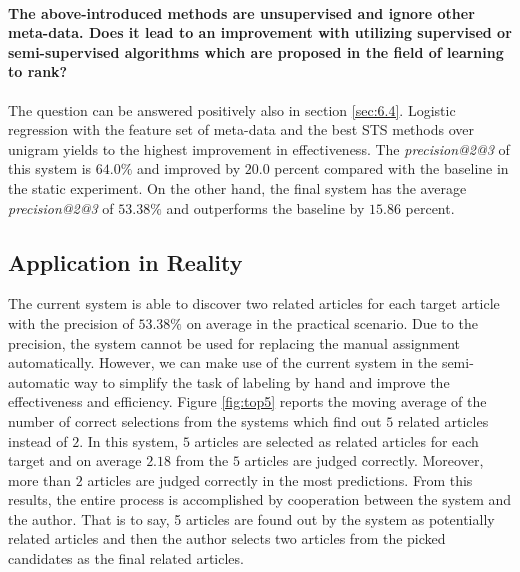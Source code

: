 \paragraph{The above-introduced methods are unsupervised and ignore other meta-data. Does it lead to an improvement with utilizing supervised or semi-supervised algorithms which are proposed in the field of learning to rank?}

The question can be answered positively also in section \ref{sec:6.4}. Logistic regression with the feature set of meta-data and the best STS methods over unigram yields to the highest improvement in effectiveness. The \textit{precision@2@3} of this system is $64.0\%$ and improved by $20.0$ percent compared with the baseline in the static experiment. On the other hand, the final system has the average \textit{precision@2@3} of $53.38\%$ and outperforms the baseline by $15.86$ percent. 

\subsection{Application in Reality}

The current system is able to discover two related articles for each target article with the precision of $53.38\%$ on average in the practical scenario. Due to the precision, the system cannot be used for replacing the manual assignment automatically. However, we can make use of the current system in the semi-automatic way to simplify the task of labeling by hand and improve the effectiveness and efficiency. Figure \ref{fig:top5} reports the moving average of the number of correct selections from the systems which find out $5$ related articles instead of $2$. In this system, $5$ articles are selected as related articles for each target and on average $2.18$ from the $5$ articles are judged correctly. Moreover, more than $2$ articles are judged correctly in the most predictions. From this results, the entire process is accomplished by cooperation between the system and the author. That is to say, 5 articles are found out by the system as potentially related articles and then the author selects two articles from the picked candidates as the final related articles. 

\clearpage

